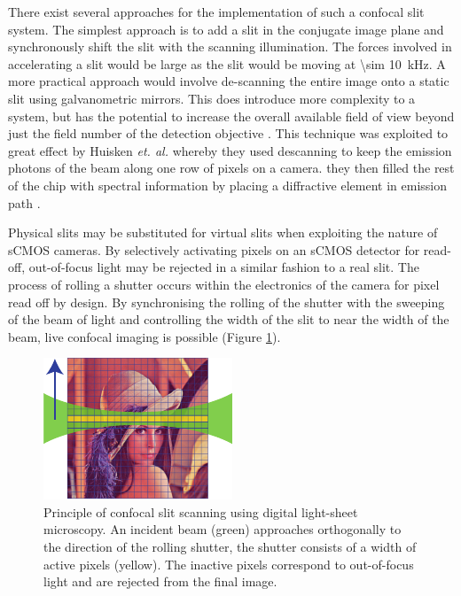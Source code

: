 There exist several approaches for the implementation of such a confocal slit system.
The simplest approach is to add a slit in the conjugate image plane and synchronously shift the slit with the scanning illumination.
The forces involved in accelerating a slit would be large as the slit would be moving at \SI{\sim 10}{\kilo\hertz}.
A more practical approach would involve de-scanning the entire image onto a static slit using galvanometric mirrors.
This does introduce more complexity to a system, but has the potential to increase the overall available field of view beyond just the field number of the detection objective \cite{Huisken}.
This technique was exploited to great effect by Huisken \emph{et. al.} whereby they used descanning to keep the emission photons of the beam along one row of pixels on a camera.
they then filled the rest of the chip with spectral information by placing a diffractive element in emission path \cite{}.

Physical slits may be substituted for virtual slits when exploiting the nature of sCMOS cameras.
By selectively activating pixels on an sCMOS detector for read-off, out-of-focus light may be rejected in a similar fashion to a real slit.
The process of rolling a shutter occurs within the electronics of the camera for pixel read off by design.
By synchronising the rolling of the shutter with the sweeping of the beam of light and controlling the width of the slit to near the width of the beam, live confocal imaging is possible (Figure \ref{fig:slit_scanning_alt}).

\begin{figure}
  \centering
  \includegraphics{slit_scanning_alt}
  \caption{Principle of confocal slit scanning using digital light-sheet microscopy.
  An incident beam (green) approaches orthogonally to the direction of the rolling shutter, the shutter consists of a width of active pixels (yellow).
  The inactive pixels correspond to out-of-focus light and are rejected from the final image.}
  \label{fig:slit_scanning_alt}
\end{figure}


